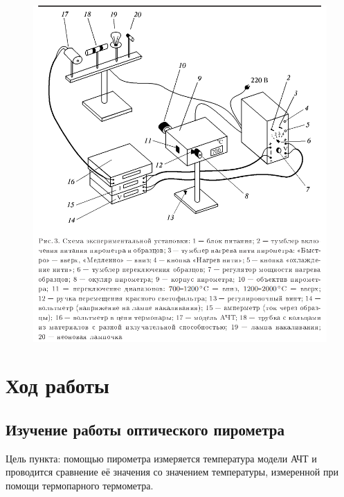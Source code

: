     \begin{figure}[h!]
        \centering
        \includegraphics[width = 13 cm]{images/exp_pic}
        \label{exp_pic}
    \end{figure}
    

\section{Ход работы}

\subsection{Изучение работы оптического пирометра}

    Цель пункта: помощью пирометра измеряется температура модели АЧТ и проводится сравнение её значения со значением температуры, измеренной при помощи термопарного термометра.

